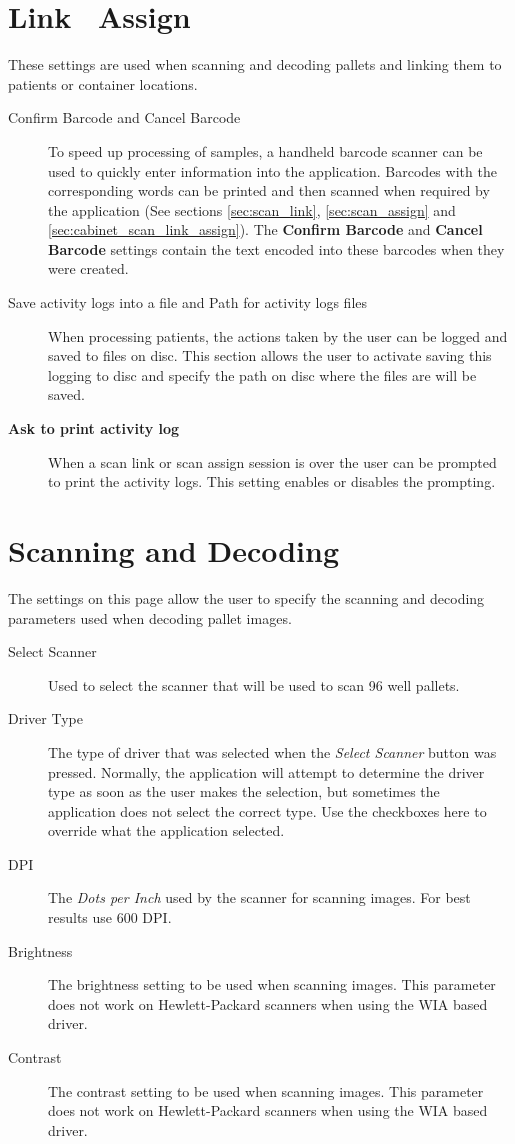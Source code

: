 \section{Link \ Assign}
These settings are used when scanning and decoding pallets and linking them to
patients or container locations.
\marginpar{\color{red}{There should  be an appendix with instructions on how to create
  these barcodes.}}
\begin{description}
  \item[Confirm Barcode and Cancel Barcode] To speed up
    processing of samples, a handheld barcode scanner can be used to quickly
    enter information into the application. Barcodes with the corresponding
    words can be printed and then scanned when required by the application (See
    sections \ref{sec:scan_link}, \ref{sec:scan_assign} and
    \ref{sec:cabinet_scan_link_assign}). The \textbf{Confirm Barcode} and
    \textbf{Cancel Barcode} settings contain the text encoded into these
    barcodes when they were created.
  \item [Save activity logs into a file and Path for activity logs files] When
    processing patients, the actions taken by the user can be logged and saved
    to files on disc. This section allows the user to activate saving this
    logging to disc and specify the path on disc where the files are will be
    saved.
  \item[\textbf{Ask to print activity log}] When a scan link or scan assign
    session is over the user can be prompted to print the activity logs. This
    setting enables or disables the prompting.
\end{description}

\section{Scanning and Decoding}
The settings on this page allow the user to specify the scanning and
decoding parameters used when decoding pallet images.
\begin{description}
  \item[Select Scanner]
 Used to select the scanner that will be used to scan
    96 well pallets.
  \item[Driver Type] The type of driver that was selected when the \emph{Select
    Scanner} button was pressed. Normally, the application will attempt to
    determine the driver type as soon as the user makes the selection, but
    sometimes the application does not select the correct type. Use the
    checkboxes here to override what the application selected.
  \item[DPI] The \emph{Dots per Inch} used by the scanner for scanning
    images. For best results use 600 DPI.
  \item[Brightness] The brightness setting to be used when scanning
    images. This parameter does not work on Hewlett-Packard scanners when using
    the WIA based driver.
  \item[Contrast] The contrast setting to be used when scanning
    images. This parameter does not work on Hewlett-Packard scanners when using
    the WIA based driver.
\end{description}

